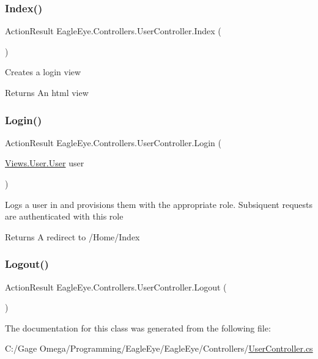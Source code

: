 \subsubsection{\texorpdfstring{Index()}{Index()}}
{\footnotesize\ttfamily Action\+Result Eagle\+Eye.\+Controllers.\+User\+Controller.\+Index (\begin{DoxyParamCaption}{ }\end{DoxyParamCaption})}



Creates a login view 

\begin{DoxyReturn}{Returns}
An html view 
\end{DoxyReturn}
\mbox{\label{class_eagle_eye_1_1_controllers_1_1_user_controller_ad2199840c954a1a465e25087fee02564}} 
\subsubsection{\texorpdfstring{Login()}{Login()}}
{\footnotesize\ttfamily Action\+Result Eagle\+Eye.\+Controllers.\+User\+Controller.\+Login (\begin{DoxyParamCaption}\item[{\mbox{\hyperlink{class_eagle_eye_1_1_views_1_1_user_1_1_user}{Views.\+User.\+User}}}]{user }\end{DoxyParamCaption})}



Logs a user in and provisions them with the appropriate role. Subsiquent requests are authenticated with this role 

\begin{DoxyReturn}{Returns}
A redirect to /\+Home/\+Index
\end{DoxyReturn}
\mbox{\label{class_eagle_eye_1_1_controllers_1_1_user_controller_a23b7abc37b240a70620675d09edecf8c}} 
\subsubsection{\texorpdfstring{Logout()}{Logout()}}
{\footnotesize\ttfamily Action\+Result Eagle\+Eye.\+Controllers.\+User\+Controller.\+Logout (\begin{DoxyParamCaption}{ }\end{DoxyParamCaption})}







The documentation for this class was generated from the following file\+:\begin{DoxyCompactItemize}
\item 
C\+:/\+Gage Omega/\+Programming/\+Eagle\+Eye/\+Eagle\+Eye/\+Controllers/\mbox{\hyperlink{_user_controller_8cs}{User\+Controller.\+cs}}\end{DoxyCompactItemize}
